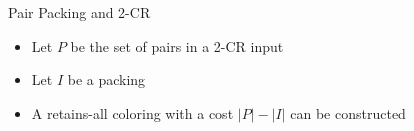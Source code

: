 \begin{frame}{Pair Packing and 2-CR}

\begin{itemize}
  \item Let $P$ be the set of pairs in a 2-CR input
  \item Let $I$ be a packing
  \item A retains-all coloring with a cost $|P| - |I|$ can be constructed 
\end{itemize}



\end{frame}